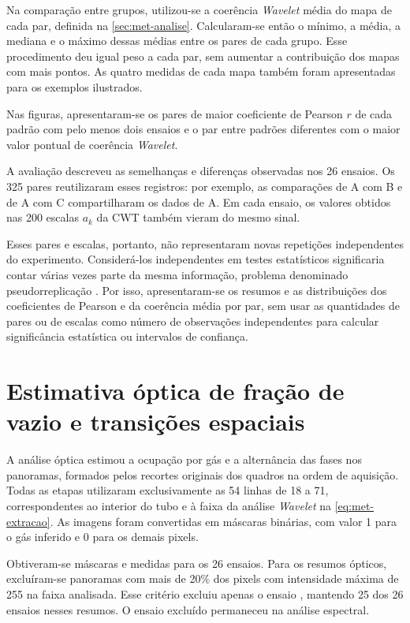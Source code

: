 Na comparação entre grupos, utilizou-se a coerência \textit{Wavelet} média do mapa
de cada par, definida na \autoref{sec:met-analise}. Calcularam-se então
o mínimo, a média, a mediana e o máximo dessas médias entre os pares
de cada grupo. Esse procedimento deu igual peso a cada par, sem aumentar
a contribuição dos mapas com mais pontos. As quatro medidas de cada mapa
também foram apresentadas para os exemplos ilustrados.

Nas figuras, apresentaram-se os pares de maior coeficiente de Pearson $r$
de cada padrão com pelo menos dois ensaios e o par entre padrões diferentes
com o maior valor pontual de coerência \textit{Wavelet}.

A avaliação descreveu as semelhanças e diferenças observadas nos 26 ensaios.
Os 325 pares reutilizaram esses registros: por exemplo, as comparações de
A com B e de A com C compartilharam os dados de A. Em cada ensaio, os valores
obtidos nas 200 escalas $a_k$ da CWT também vieram do mesmo sinal.

Esses pares e escalas, portanto, não representaram novas repetições
independentes do experimento. Considerá-los independentes em testes
estatísticos significaria contar várias vezes parte da mesma informação,
problema denominado pseudorreplicação \cite{hurlbert1984}. Por isso,
apresentaram-se os resumos e as distribuições dos coeficientes de Pearson
e da coerência média por par,
sem usar as quantidades de pares ou de escalas como número de observações
independentes para calcular significância estatística ou intervalos de confiança.

\section{Estimativa óptica de fração de vazio e transições espaciais}\label{sec:met-void}

A análise óptica estimou a ocupação por gás e a alternância das fases nos
panoramas, formados pelos recortes originais dos quadros na ordem de aquisição.
Todas as etapas utilizaram exclusivamente as 54 linhas de 18 a 71,
correspondentes ao interior do tubo e à faixa da análise \textit{Wavelet} na
\autoref{eq:met-extracao}. As imagens foram convertidas em máscaras binárias,
com valor 1 para o gás inferido e 0 para os demais pixels.

Obtiveram-se máscaras e medidas para os 26 ensaios. Para os resumos
ópticos, excluíram-se panoramas com mais de 20\% dos pixels
com intensidade máxima de 255 na faixa analisada. Esse critério excluiu apenas
o ensaio \mbox{}, mantendo 25 dos 26 ensaios nesses resumos.
O ensaio excluído permaneceu na análise espectral.

